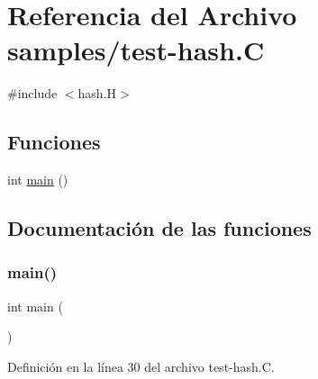 \hypertarget{test-hash_8_c}{}\section{Referencia del Archivo samples/test-\/hash.C}
\label{test-hash_8_c}
{\ttfamily \#include $<$hash.\+H$>$}\newline
\subsection*{Funciones}
\begin{DoxyCompactItemize}
\item 
int \hyperlink{test-hash_8_c_ae66f6b31b5ad750f1fe042a706a4e3d4}{main} ()
\end{DoxyCompactItemize}


\subsection{Documentación de las funciones}
\mbox{\label{test-hash_8_c_ae66f6b31b5ad750f1fe042a706a4e3d4}} 
\subsubsection{\texorpdfstring{main()}{main()}}
{\footnotesize\ttfamily int main (\begin{DoxyParamCaption}{ }\end{DoxyParamCaption})}



Definición en la línea 30 del archivo test-\/hash.\+C.

